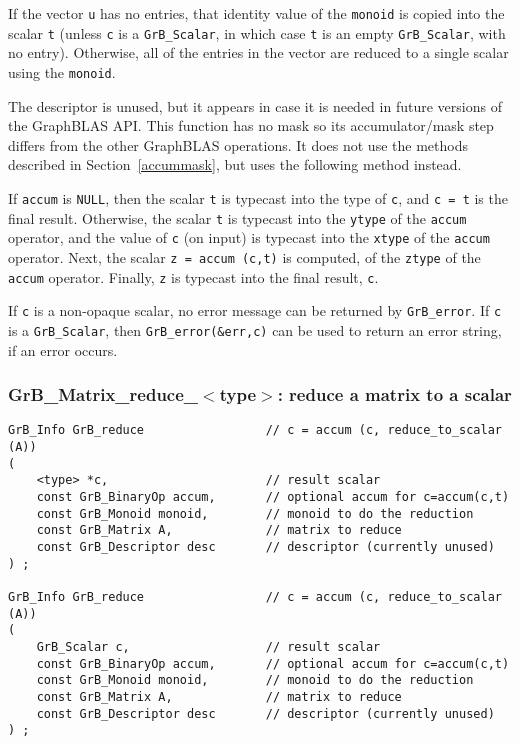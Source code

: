 \documentclass[12pt]{article}
\begin{document}
If the vector \verb'u' has no entries, that identity value of the \verb'monoid'
is copied into the scalar \verb't' (unless \verb'c' is a \verb'GrB_Scalar',
in which case \verb't' is an empty \verb'GrB_Scalar', with no entry).
Otherwise, all of the entries in the
vector are reduced to a single scalar using the \verb'monoid'.

The descriptor is unused, but it appears in case it is needed in future
versions of the GraphBLAS API.
This function has no mask so its accumulator/mask step differs from the other
GraphBLAS operations.  It does not use the methods described in
Section~\ref{accummask}, but uses the following method instead.

If \verb'accum' is \verb'NULL', then the scalar \verb't' is typecast into the
type of \verb'c', and \verb'c = t' is the final result.  Otherwise, the scalar
\verb't' is typecast into the \verb'ytype' of the \verb'accum' operator, and
the value of \verb'c' (on input) is typecast into the \verb'xtype' of the
\verb'accum' operator.  Next, the scalar \verb'z = accum (c,t)' is computed, of
the \verb'ztype' of the \verb'accum' operator.  Finally, \verb'z' is typecast
into the final result, \verb'c'.

If \verb'c' is a non-opaque scalar, no error message can be returned by
\verb'GrB_error'.  If \verb'c' is a \verb'GrB_Scalar', then
\verb'GrB_error(&err,c)' can be used to return an error string, if an error
occurs.

\subsubsection{{\sf GrB\_Matrix\_reduce\_$<$type$>$:} reduce a matrix to a scalar}
\label{reduce_matrix_to_scalar}

\begin{mdframed}[userdefinedwidth=6in]
{\footnotesize
\begin{verbatim}
GrB_Info GrB_reduce                 // c = accum (c, reduce_to_scalar (A))
(
    <type> *c,                      // result scalar
    const GrB_BinaryOp accum,       // optional accum for c=accum(c,t)
    const GrB_Monoid monoid,        // monoid to do the reduction
    const GrB_Matrix A,             // matrix to reduce
    const GrB_Descriptor desc       // descriptor (currently unused)
) ;

GrB_Info GrB_reduce                 // c = accum (c, reduce_to_scalar (A))
(
    GrB_Scalar c,                   // result scalar
    const GrB_BinaryOp accum,       // optional accum for c=accum(c,t)
    const GrB_Monoid monoid,        // monoid to do the reduction
    const GrB_Matrix A,             // matrix to reduce
    const GrB_Descriptor desc       // descriptor (currently unused)
) ;
\end{verbatim} } \end{mdframed}
\end{document}

